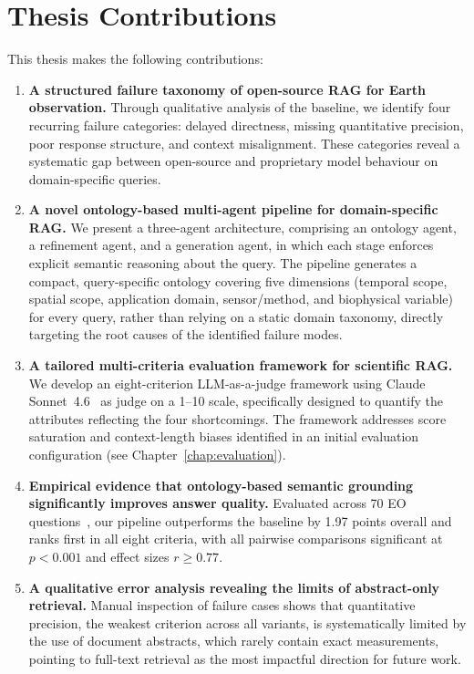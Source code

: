 \section{Thesis Contributions}
\label{sec:contribution}

This thesis makes the following contributions:

\begin{enumerate}
\item \textbf{A structured failure taxonomy of open-source RAG for Earth observation.}
Through qualitative analysis of the baseline, we identify four recurring failure
categories: delayed directness, missing quantitative precision, poor response structure,
and context misalignment. These categories reveal a systematic gap between open-source
and proprietary model behaviour on domain-specific queries.

\item \textbf{A novel ontology-based multi-agent pipeline for domain-specific RAG.}
We present a three-agent architecture, comprising an ontology agent, a refinement agent,
and a generation agent, in which each stage enforces explicit semantic reasoning about
the query. The pipeline generates a compact, query-specific ontology covering five
dimensions (temporal scope, spatial scope, application domain, sensor/method, and
biophysical variable) for every query, rather than relying on a static domain taxonomy,
directly targeting the root causes of the identified failure modes.

\item \textbf{A tailored multi-criteria evaluation framework for scientific RAG.}
We develop an eight-criterion LLM-as-a-judge framework using Claude
Sonnet~4.6~\citep{anthropic2024claude} as judge on a 1--10 scale, specifically designed
to quantify the attributes reflecting the four shortcomings. The framework addresses
score saturation and context-length biases identified in an initial evaluation
configuration (see Chapter~\ref{chap:evaluation}).

\item \textbf{Empirical evidence that ontology-based semantic grounding significantly
improves answer quality.}
Evaluated across 70 EO questions~\citep{elbaff2025earthobservationrag}, our pipeline
outperforms the baseline by 1.97 points overall and ranks first in all eight criteria,
with all pairwise comparisons significant at $p < 0.001$ and effect sizes
$r \geq 0.77$.

\item \textbf{A qualitative error analysis revealing the limits of abstract-only
retrieval.}
Manual inspection of failure cases shows that quantitative precision, the weakest
criterion across all variants, is systematically limited by the use of document
abstracts, which rarely contain exact measurements, pointing to full-text retrieval as
the most impactful direction for future work.
\end{enumerate}

